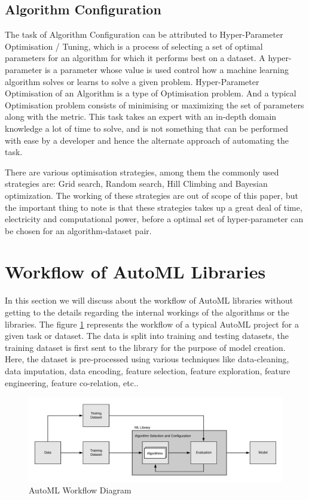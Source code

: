 \subsection{Algorithm Configuration}

The task of Algorithm Configuration can be attributed to Hyper-Parameter Optimisation / Tuning, which is a process of selecting a set of optimal parameters for an algorithm for which it performs best on a dataset. A hyper-parameter is a parameter whose value is used control how a machine learning algorithm solves or learns to solve a given problem. Hyper-Parameter Optimisation of an Algorithm is a type of Optimisation problem. And a typical Optimisation problem consists of minimising or maximizing the set of parameters along with the metric. This task takes an expert with an in-depth domain knowledge a lot of time to solve, and is not something that can be performed with ease by a developer and hence the alternate approach of automating the task.

There are various optimisation strategies, among them the commonly used strategies are: Grid search, Random search, Hill Climbing and Bayesian optimization. The working of these strategies are out of scope of this paper, but the important thing to note is that these strategies takes up a great deal of time, electricity and computational power, before a optimal set of hyper-parameter can be chosen for an algorithm-dataset pair.

\section{Workflow of AutoML Libraries}
\label{workflow-automl}

In this section we will discuss about the workflow of AutoML libraries without getting to the details regarding the internal workings of the algorithms or the libraries. The figure \ref{automl-workflow-diagram} represents the workflow of a typical AutoML project for a given task or dataset. The data is split into training and testing datasets, the training dataset is first sent to the library for the purpose of model creation. Here, the dataset is pre-processed using various techniques like data-cleaning, data imputation, data encoding, feature selection, feature exploration, feature engineering, feature co-relation, etc..

\begin{figure}[t]
    \centering
    \includegraphics[width=16cm]{images/ML Workflow.jpeg}
    \caption{AutoML Workflow Diagram}
    \label{automl-workflow-diagram}
\end{figure}

